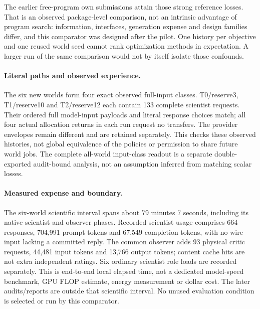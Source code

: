 The earlier free-program own submissions attain those strong reference
losses. That is an observed package-level comparison, not an intrinsic
advantage of program search: information, interfaces, generation expense and
design families differ, and this comparator was designed after the pilot.
One history per objective and one reused world seed cannot rank optimization
methods in expectation. A larger run of the same comparison would not by
itself isolate those confounds.

\paragraph{Literal paths and observed experience.}
The six new worlds form four exact observed full-input classes. T0/reserve3,
T1/reserve10 and T2/reserve12 each contain 133 complete scientist requests.
Their ordered full model-input payloads and literal response choices match;
all four actual allocation returns in each run request no transfers.
The provider envelopes remain different and are retained separately. This
checks these observed histories, not global equivalence of the policies
or permission to share future world jobs. The complete all-world input-class
readout is a separate double-exported audit-bound analysis, not an assumption inferred
from matching scalar losses.

\paragraph{Measured expense and boundary.}
The six-world scientific interval spans about 79 minutes 7 seconds, including
its native scientist and observer phases. Recorded scientist usage comprises
664 responses, 704,991 prompt tokens and 67,549 completion tokens, with no
wire input lacking a committed reply. The common observer adds 93 physical
critic requests, 44,481 input tokens and 13,766 output tokens; content cache hits
are not extra independent ratings. Six ordinary scientist role loads are
recorded separately. This is end-to-end local elapsed time, not a dedicated
model-speed benchmark, GPU FLOP estimate, energy measurement or dollar cost.
The later audits/reports are outside that scientific interval. No unused
evaluation condition is selected or run by this comparator.
